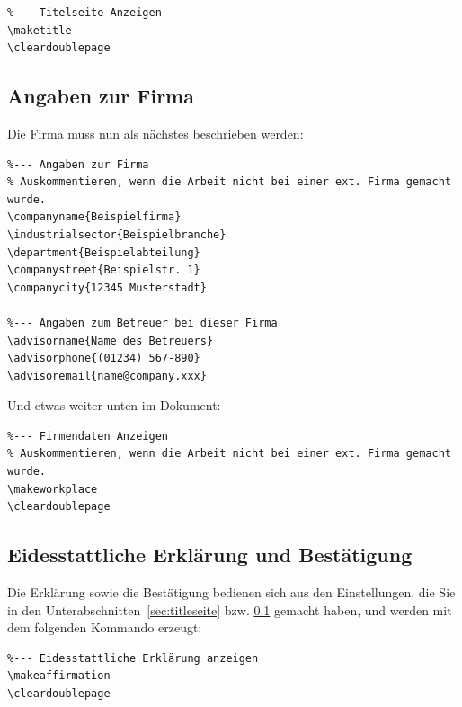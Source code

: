 \documentclass[pdftex,a4paper]{scrartcl}
\begin{document}
\begin{verbatim}
%--- Titelseite Anzeigen
\maketitle
\cleardoublepage
\end{verbatim}

\subsection{Angaben zur Firma}
\label{sec:praxisstelle}
Die Firma muss nun als nächstes beschrieben werden:

\begin{verbatim}
%--- Angaben zur Firma
% Auskommentieren, wenn die Arbeit nicht bei einer ext. Firma gemacht wurde.
\companyname{Beispielfirma}
\industrialsector{Beispielbranche}
\department{Beispielabteilung}
\companystreet{Beispielstr. 1}
\companycity{12345 Musterstadt}

%--- Angaben zum Betreuer bei dieser Firma
\advisorname{Name des Betreuers}
\advisorphone{(01234) 567-890}
\advisoremail{name@company.xxx}
\end{verbatim}

Und etwas weiter unten im Dokument:

\begin{verbatim}
%--- Firmendaten Anzeigen
% Auskommentieren, wenn die Arbeit nicht bei einer ext. Firma gemacht wurde.
\makeworkplace
\cleardoublepage
\end{verbatim}


\subsection{Eidesstattliche Erklärung und Bestätigung}

Die Erklärung sowie die Bestätigung bedienen sich aus den Einstellungen,
die Sie in den Unterabschnitten~\ref{sec:titleseite} bzw. \ref{sec:praxisstelle}
gemacht haben, und werden mit dem folgenden Kommando erzeugt:

\begin{verbatim}
%--- Eidesstattliche Erklärung anzeigen
\makeaffirmation
\cleardoublepage
\end{verbatim}
\end{document}
